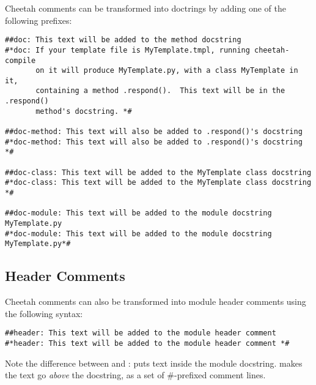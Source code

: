 Cheetah comments can be transformed into doctrings by adding one of the
following prefixes:

\begin{verbatim}
##doc: This text will be added to the method docstring
#*doc: If your template file is MyTemplate.tmpl, running cheetah-compile
       on it will produce MyTemplate.py, with a class MyTemplate in it,
       containing a method .respond().  This text will be in the .respond()
       method's docstring. *#

##doc-method: This text will also be added to .respond()'s docstring
#*doc-method: This text will also be added to .respond()'s docstring *#

##doc-class: This text will be added to the MyTemplate class docstring
#*doc-class: This text will be added to the MyTemplate class docstring *#

##doc-module: This text will be added to the module docstring MyTemplate.py
#*doc-module: This text will be added to the module docstring MyTemplate.py*#
\end{verbatim}

\subsection{Header Comments}
\label{comments.headers}
Cheetah comments can also be transformed into module header comments using the
following syntax:

\begin{verbatim}
##header: This text will be added to the module header comment
#*header: This text will be added to the module header comment *#
\end{verbatim}

Note the difference between  and :
 puts  text inside the module docstring.   makes the text go {\em above} the docstring, as a
set of \#-prefixed comment lines.

